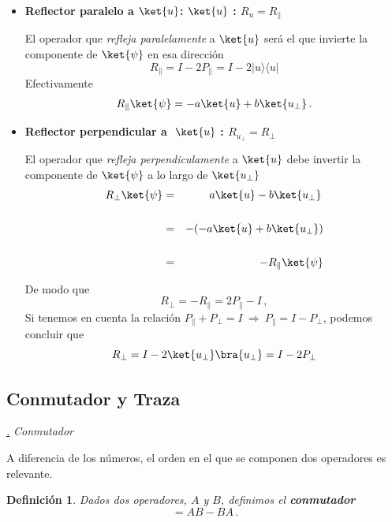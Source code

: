 \documentclass[a4paper,11pt]{book} %
\newtheorem{definicion_contador}{Definición}
\newcommand{\Definicion}[1]{
		\begin{mybox_gray2}{}
			\begin{definicion_contador}
				 #1 
			\end{definicion_contador} 
		\end{mybox_gray2}
	}
\numberwithin{equation}{chapter}
\newcommand{\ketbra}[2]{| #1\rangle \! \langle #2|}
\def\subsubiContadorIt{\par\addtocounter{subsubsection}{1}\underline{\it\thesubsubsection.}\hskip0.5cm \setcounter{subsubsubsectionIt}{0}}
\newcommand{\SubsubiIt}[1]{
		\subsubiContadorIt \textit{#1}
	}
\newcounter{subsubsubsectionIt}[subsubsection]
\begin{document}
\begin{itemize}
	\item \textbf{Reflector paralelo a $\ket{u}$: $\ket{u}~$: $R_u = R_\|$}
	
	El operador que \textit{refleja  paralelamente} a $\ket{u}$ será  el que invierte la componente de $\ket{\psi}$ en esa dirección
	\begin{equation}
	\boxed{R_\| =  I - 2P_\| = I - 2\ketbra{u}{u}}
	\end{equation}
Efectivamente 
$$ R_\|\ket{\psi} = - a \ket{u} + b \ket{u_\perp}\, .$$ 

	\item \textbf{Reflector perpendicular a $~\ket{u}~$: $R_{u_\perp} = R_\perp$}
	
	El operador que \textit{refleja  perpendiculamente} a $\ket{u}$ debe invertir la componente de $\ket{\psi}$ a lo largo de $\ket{u_\perp}$ 
\begin{eqnarray*}
R_\perp\ket{\psi} &=&  a \ket{u} - b \ket{u_\perp}\,  \\ \rule{0mm}{8mm}
&=& - (-a \ket{u} + b \ket{u_\perp}) \\ \rule{0mm}{8mm}
&=& -R_\| \ket{\psi}
\end{eqnarray*}

De modo que 
	\begin{equation}
	\boxed{R_\perp = -R_\| = 2P_\| - I} \, ,
	\end{equation}
Si tenemos en cuenta la relación  $P_\| + P_\perp = I~ \Rightarrow ~P_\| = I - P_\perp$, podemos concluir que
	\begin{equation}
	R_\perp = I - 2\ket{u_\perp}\bra{u_\perp} = I - 2 P_\perp
	\end{equation}
\end{itemize}	
	



		\subsection{Conmutador y Traza}




			\SubsubiIt{Conmutador}

A diferencia de los números, el orden en el que se componen dos operadores es relevante.

	\Definicion{
	Dados dos operadores, $A$ y $B$, definimos el \textbf{conmutador}
	\begin{equation}
	[A,B] = AB-BA \,.
	\end{equation}
	}
\end{document}
